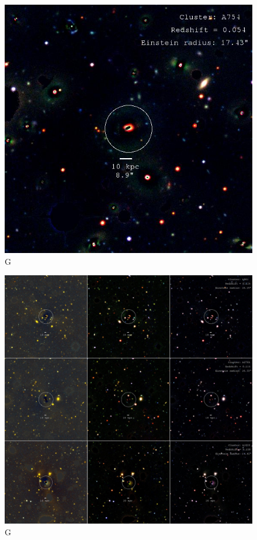 \begin{figure}[H]
\centering
\includegraphics[width=12cm]{images/cA754_galfit.jpg}
\caption[M]{G}
\end{figure}


\begin{figure}[H]
\centering
\includegraphics[width=15cm]{images/full_real.jpg}
\caption[M]{G}
\end{figure}

